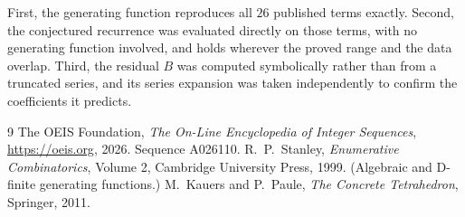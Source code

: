 \documentclass[11pt,a4paper]{article}
\theoremstyle{plain}
\theoremstyle{definition}
\begin{document}
First, the generating function reproduces all $26$ published terms exactly. Second,
the conjectured recurrence was evaluated directly on those terms, with no generating function
involved, and holds wherever the proved range and the data overlap. Third, the residual $B$ was
computed symbolically rather than from a truncated series, and its series expansion was taken
independently to confirm the coefficients it predicts.

\begin{thebibliography}{9}
 The OEIS Foundation, \emph{The On-Line Encyclopedia of Integer Sequences},
\url{https://oeis.org}, 2026. Sequence A026110.
 R.~P.~Stanley, \emph{Enumerative Combinatorics}, Volume 2, Cambridge
University Press, 1999. (Algebraic and D-finite generating functions.)
 M.~Kauers and P.~Paule, \emph{The Concrete Tetrahedron}, Springer, 2011.
\end{thebibliography}
\end{document}
